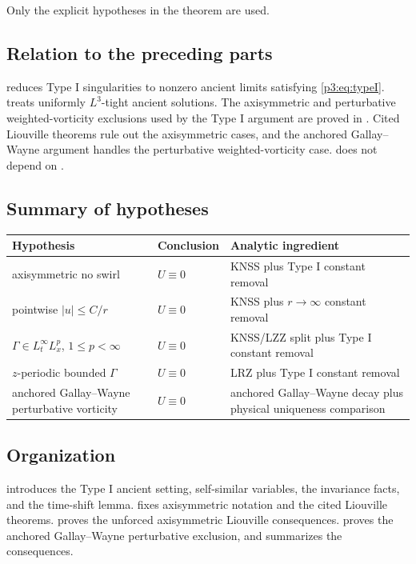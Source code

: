 \documentclass[11pt]{amsart}
\theoremstyle{plain}
\theoremstyle{definition}
\theoremstyle{remark}
\numberwithin{equation}{section}
\begin{document}
Only the explicit hypotheses in the theorem are used.

\subsection{Relation to the preceding parts}

 reduces Type I singularities to nonzero ancient
limits satisfying \eqref{p3:eq:typeI}.   treats
uniformly \(L^3\)-tight ancient solutions.  The axisymmetric and perturbative
weighted-vorticity exclusions used by the Type I argument are proved in
.  Cited
Liouville theorems rule out the axisymmetric cases, and the anchored
Gallay--Wayne argument handles the perturbative weighted-vorticity case.
 does not depend on
.

\subsection{Summary of hypotheses}

\begin{center}
\begin{tabular}{p{}p{}p{}}
\hline
Hypothesis & Conclusion & Analytic ingredient \\
\hline
axisymmetric no swirl & \(U\equiv0\) & KNSS plus Type I constant removal \\
pointwise \(|u|\le C/r\) & \(U\equiv0\) & KNSS plus \(r\to\infty\) constant removal \\
\(\Gamma\in L_t^\infty L_x^p\), \(1\le p<\infty\) & \(U\equiv0\) & KNSS/LZZ split plus Type I constant removal \\
\(z\)-periodic bounded \(\Gamma\) & \(U\equiv0\) & LRZ plus Type I constant removal \\
anchored Gallay--Wayne perturbative vorticity & \(U\equiv0\) & anchored Gallay--Wayne decay plus physical uniqueness comparison \\
\hline
\end{tabular}
\end{center}

\subsection{Organization}

 introduces the Type I ancient setting, self-similar variables, the
invariance facts, and the time-shift lemma.
 fixes axisymmetric notation and the
cited Liouville theorems.   proves the
unforced axisymmetric Liouville consequences.
 proves the anchored Gallay--Wayne perturbative exclusion, and
 summarizes the consequences.
\end{document}
